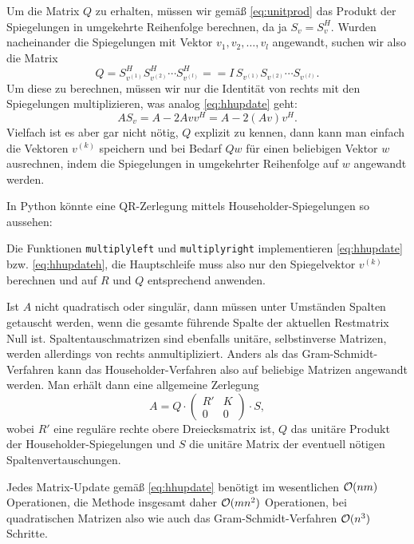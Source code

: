 Um die Matrix $Q$ zu erhalten, müssen wir gemäß \eqref{eq:unitprod}
das Produkt der Spiegelungen in umgekehrte Reihenfolge berechnen, da
ja $S_v = S_v^H$. Wurden nacheinander die Spiegelungen mit Vektor
$v_1, v_2,\ldots,v_{l}$ angewandt, suchen wir also die Matrix
\begin{equation}
  Q = S_{v^{(1)}}^HS_{v^{(2)}}^H\cdots S_{v^{(l)}}^H =
  = I\,S_{v^{(1)}}S_{v^{(2)}}\cdots S_{v^{(l)}}.
\end{equation}
Um diese zu berechnen, müssen wir nur die Identität von rechts mit den
Spiegelungen multiplizieren, was analog \eqref{eq:hhupdate} geht:
\begin{equation}
  \label{eq:hhupdateh}
  AS_v  = A - 2Av v^H = A - 2(Av) v^H.
\end{equation}
Vielfach ist es aber gar nicht nötig, $Q$ explizit zu kennen, dann
kann man einfach die Vektoren $v^{(k)}$ speichern und bei Bedarf $Qw$
für einen beliebigen Vektor $w$ ausrechnen, indem die Spiegelungen in
umgekehrter Reihenfolge auf $w$ angewandt werden.

In Python könnte eine QR-Zerlegung mittels Householder-Spiegelungen
so aussehen:

Die Funktionen \lstinline!multiplyleft! und \lstinline!multiplyright!
implementieren \eqref{eq:hhupdate} bzw. \eqref{eq:hhupdateh}, die
Hauptschleife muss also nur den Spiegelvektor $v^{(k)}$ berechnen und
auf $R$ und $Q$ entsprechend anwenden.

Ist $A$ nicht quadratisch oder singulär, dann müssen unter Umständen
Spalten getauscht werden, wenn die gesamte führende Spalte der
aktuellen Restmatrix Null ist. Spaltentauschmatrizen sind ebenfalls
unitäre, selbstinverse Matrizen, werden allerdings von rechts
anmultipliziert. Anders als das Gram-Schmidt-Verfahren kann das
Householder-Verfahren also auf beliebige Matrizen angewandt
werden. Man erhält dann eine allgemeine Zerlegung
\begin{equation}
  A = Q \cdot \begin{pmatrix}
    R' & K \\
    0 & 0
  \end{pmatrix} \cdot S,
\end{equation}
wobei $R'$ eine reguläre rechte obere Dreiecksmatrix ist, $Q$ das
unitäre Produkt der Householder-Spiegelungen und $S$ die unitäre
Matrix der eventuell nötigen Spaltenvertauschungen.

Jedes Matrix-Update gemäß \eqref{eq:hhupdate} benötigt im wesentlichen
$\mathcal O(nm)$ Operationen, die Methode insgesamt daher $\mathcal O(mn^2)$
Operationen, bei quadratischen Matrizen also wie auch das
Gram-Schmidt-Verfahren $\mathcal O(n^3)$ Schritte.

